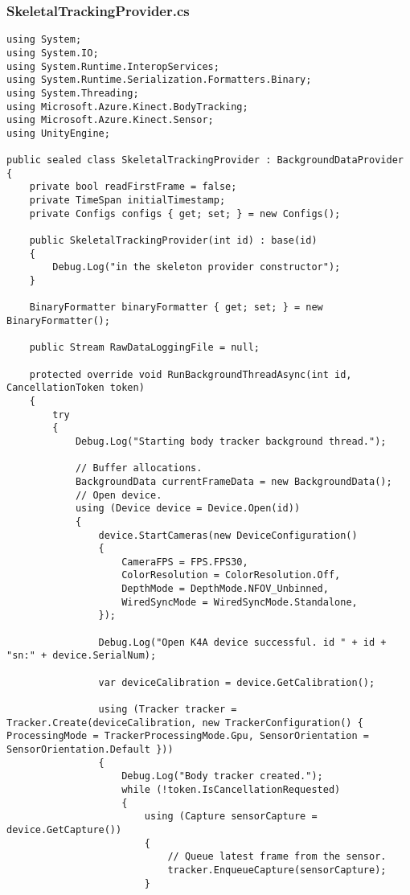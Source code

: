 \subsubsection*{SkeletalTrackingProvider.cs}
\begin{verbatim}
﻿using System;
using System.IO;
using System.Runtime.InteropServices;
using System.Runtime.Serialization.Formatters.Binary;
using System.Threading;
using Microsoft.Azure.Kinect.BodyTracking;
using Microsoft.Azure.Kinect.Sensor;
using UnityEngine;

public sealed class SkeletalTrackingProvider : BackgroundDataProvider
{
    private bool readFirstFrame = false;
    private TimeSpan initialTimestamp;
    private Configs configs { get; set; } = new Configs();

    public SkeletalTrackingProvider(int id) : base(id)
    {
        Debug.Log("in the skeleton provider constructor");
    }

    BinaryFormatter binaryFormatter { get; set; } = new BinaryFormatter();

    public Stream RawDataLoggingFile = null;

    protected override void RunBackgroundThreadAsync(int id, CancellationToken token)
    {
        try
        {
            Debug.Log("Starting body tracker background thread.");

            // Buffer allocations.
            BackgroundData currentFrameData = new BackgroundData();
            // Open device.
            using (Device device = Device.Open(id))
            {
                device.StartCameras(new DeviceConfiguration()
                {
                    CameraFPS = FPS.FPS30,
                    ColorResolution = ColorResolution.Off,
                    DepthMode = DepthMode.NFOV_Unbinned,
                    WiredSyncMode = WiredSyncMode.Standalone,
                });

                Debug.Log("Open K4A device successful. id " + id + "sn:" + device.SerialNum);

                var deviceCalibration = device.GetCalibration();

                using (Tracker tracker = Tracker.Create(deviceCalibration, new TrackerConfiguration() { ProcessingMode = TrackerProcessingMode.Gpu, SensorOrientation = SensorOrientation.Default }))
                {
                    Debug.Log("Body tracker created.");
                    while (!token.IsCancellationRequested)
                    {
                        using (Capture sensorCapture = device.GetCapture())
                        {
                            // Queue latest frame from the sensor.
                            tracker.EnqueueCapture(sensorCapture);
                        }


\end{verbatim}
